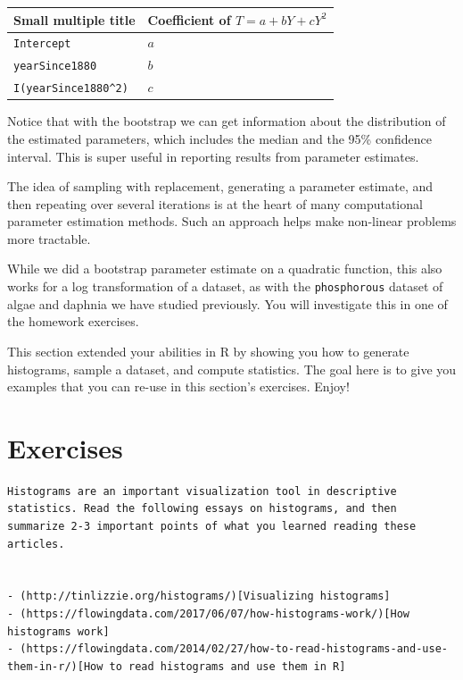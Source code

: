 \documentclass[
]{book}
\theoremstyle{definition}
\theoremstyle{definition}
\theoremstyle{definition}
\theoremstyle{remark}
\begin{document}
\begin{longtable}[]{@{}ll@{}}
\toprule
\textbf{Small multiple title} & \textbf{Coefficient of } \(T=a + bY + cY^{2}\) \\
\midrule
\endhead
\texttt{Intercept} & \(a\) \\
\texttt{yearSince1880} & \(b\) \\
\texttt{I(yearSince1880\^{}2)} & \(c\) \\
\bottomrule
\end{longtable}

Notice that with the bootstrap we can get information about the distribution of the estimated parameters, which includes the median and the 95\% confidence interval. This is super useful in reporting results from parameter estimates.

The idea of sampling with replacement, generating a parameter estimate, and then repeating over several iterations is at the heart of many computational parameter estimation methods. Such an approach helps make non-linear problems more tractable.

While we did a bootstrap parameter estimate on a quadratic function, this also works for a log transformation of a dataset, as with the \texttt{phosphorous} dataset of algae and daphnia we have studied previously. You will investigate this in one of the homework exercises.

This section extended your abilities in R by showing you how to generate histograms, sample a dataset, and compute statistics. The goal here is to give you examples that you can re-use in this section's exercises. Enjoy!

\newpage

\hypertarget{exercises-10}{%
\section{Exercises}\label{exercises-10}}

\begin{verbatim}
Histograms are an important visualization tool in descriptive statistics. Read the following essays on histograms, and then summarize 2-3 important points of what you learned reading these articles.


- (http://tinlizzie.org/histograms/)[Visualizing histograms]
- (https://flowingdata.com/2017/06/07/how-histograms-work/)[How histograms work]
- (https://flowingdata.com/2014/02/27/how-to-read-histograms-and-use-them-in-r/)[How to read histograms and use them in R]
\end{verbatim}
\end{document}
